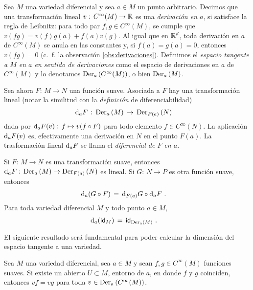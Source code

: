 Sea $M$ una variedad diferencial y sea $a\in M$ un punto arbitrario.
Decimos que una transformaci\'{o}n lineal $v:\,C^{\infty}(M)\rightarrow\bb{R}$
es una \emph{derivaci\'{o}n en $a$}, si satisface la regla de Leibnitz:
para todo par $f,g\in C^{\infty}(M)$, se cumple que $v(fg)=v(f)g(a)+f(a)v(g)$.
Al igual que en $\bb{R}^{d}$, toda derivaci\'{o}n en $a$ de $C^{\infty}(M)$
se anula en las constantes y, si $f(a)=g(a)=0$, entonces $v(fg)=0$ (c.~f.
la observaci\'{o}n \ref{obs:derivaciones}). Definimos el \emph{espacio %
tangente a $M$ en $a$ en sentido de derivaciones} como el espacio de
derivaciones en $a$ de $C^{\infty}(M)$ y lo denotamos
$\derivaciones[a]{C^{\infty}(M)}$, o bien $\derivaciones[a]{M}$.

Sea ahora $F:\,M\rightarrow N$ una funci\'{o}n suave. Asociada a $F$ hay una
transformaci\'{o}n lineal (notar la similitud con la \emph{definici\'{o}n}
de diferenciabilidad)
\begin{align*}
	\diferencial[a]{F} & \,:\,\derivaciones[a]{M}\,\rightarrow\,
		\derivaciones[F(a)]{N}
\end{align*}
%
dada por $\diferencial[a]{F}(v):\,f\mapsto v(f\circ F)$ para todo elemento
$f\in C^{\infty}(N)$. La aplicaci\'{o}n $\diferencial[a]{F}(v)$ es,
efectivamente una derivaci\'{o}n en $N$ en el punto $F(a)$. La
trasformaci\'{o}n lineal $\diferencial[a]{F}$ se llama el \emph{diferencial %
de $F$ en $a$}.

\begin{propoElDiferencial}\label{thm:eldiferencial}
	Si $F:\,M\rightarrow N$ es una transformaci\'{o}n suave, entonces
	$\diferencial[a]{F}:\,\derivaciones[a]{M}\rightarrow%
	\derivaciones[F(a)]{N}$ es lineal. Si $G:\,N\rightarrow P$ es
	otra funci\'{o}n suave, entonces
	\begin{align*}
		\diferencial[a]{(G\circ F)} & \,=\,
			\diferencial[F(a)]{G}\circ\diferencial[a]{F}
		\text{ .}
	\end{align*}
	Para toda variedad diferencial $M$ y todo punto $a\in M$,
	\begin{align*}
		\diferencial[a]{(\id[M])} & \,=\,
			\id[{\derivaciones[a]{M}}]
		\text{ .}
	\end{align*}
\end{propoElDiferencial}

El siguiente resultado ser\'{a} fundamental para poder calcular la
dimensi\'{o}n del espacio tangente a una variedad.

\begin{lemaDerivacionesSonLocales}\label{thm:derivacionessonlocales}
	Sea $M$ una variedad diferencial, sea $a\in M$ y sean
	$f,g\in C^{\infty}(M)$ funciones suaves. Si existe un
	abierto $U\subset M$, entorno de $a$, en donde $f$ y $g$ coinciden,
	entonces $vf=vg$ para toda $v\in\derivaciones[a]{C^{\infty}(M)}$.
\end{lemaDerivacionesSonLocales}

